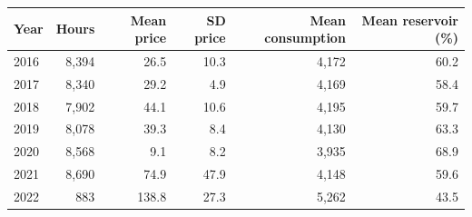 \begin{tabular}{lrrrrr}
\toprule
Year & Hours & Mean price & SD price & Mean consumption & Mean reservoir (\%) \\
\midrule
2016 & 8{,}394 & 26.5 & 10.3 & 4{,}172 & 60.2 \\
2017 & 8{,}340 & 29.2 & 4.9 & 4{,}169 & 58.4 \\
2018 & 7{,}902 & 44.1 & 10.6 & 4{,}195 & 59.7 \\
2019 & 8{,}078 & 39.3 & 8.4 & 4{,}130 & 63.3 \\
2020 & 8{,}568 & 9.1 & 8.2 & 3{,}935 & 68.9 \\
2021 & 8{,}690 & 74.9 & 47.9 & 4{,}148 & 59.6 \\
2022 & 883 & 138.8 & 27.3 & 5{,}262 & 43.5 \\
\bottomrule
\end{tabular}
